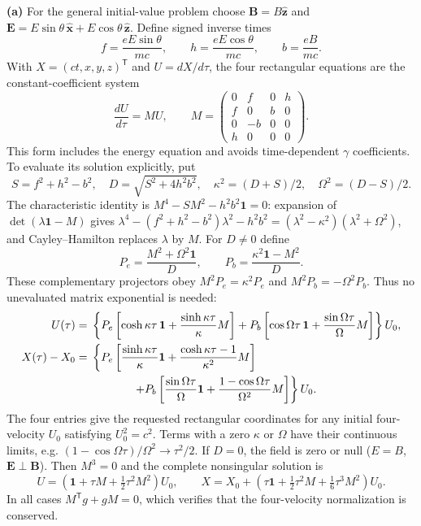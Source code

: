 \medskip\noindent\textbf{(a)} For the general initial-value problem choose
$\mathbf B=B\widehat{\mathbf z}$ and
$\mathbf E=E\sin\theta\,\widehat{\mathbf x}
+E\cos\theta\,\widehat{\mathbf z}$.  Define signed inverse times
\[
f=\frac{eE\sin\theta}{mc},\qquad
h=\frac{eE\cos\theta}{mc},\qquad b=\frac{eB}{mc}.
\]
With $X=(ct,x,y,z)^{\mathsf T}$ and $U=dX/d\tau$, the four
rectangular equations are the constant-coefficient system
\[
\frac{dU}{d\tau}=MU,\qquad
M=\begin{pmatrix}0&f&0&h\\ f&0&b&0\\0&-b&0&0\\h&0&0&0\end{pmatrix}.
\]
This form includes the energy equation and avoids time-dependent
$\gamma$ coefficients.  To evaluate its solution explicitly, put
\[
S=f^2+h^2-b^2,\quad D=\sqrt{S^2+4h^2b^2},\quad
\kappa^2=(D+S)/2,\quad \Omega^2=(D-S)/2.
\]
The characteristic identity is
$M^4-SM^2-h^2b^2\mathbf1=0$: expansion of
$\det(\lambda\mathbf1-M)$ gives
$\lambda^4-(f^2+h^2-b^2)\lambda^2-h^2b^2
=(\lambda^2-\kappa^2)(\lambda^2+\Omega^2)$, and
Cayley--Hamilton replaces $\lambda$ by $M$.
For $D\ne0$ define
\[
P_e=\frac{M^2+\Omega^2\mathbf1}{D},\qquad
P_b=\frac{\kappa^2\mathbf1-M^2}{D}.
\]
These complementary projectors obey $M^2P_e=\kappa^2P_e$ and
$M^2P_b=-\Omega^2P_b$.  Thus no unevaluated matrix exponential
is needed:
\begin{align*}
U(\tau)={}&\left\{P_e\left[\cosh\kappa\tau\,\mathbf1+
 \frac{\sinh\kappa\tau}{\kappa}M\right]
 +P_b\left[\cos\Omega\tau\,\mathbf1+
 \frac{\sin\Omega\tau}{\Omega}M\right]\right\}U_0,\\
X(\tau)-X_0={}&\left\{P_e\left[\frac{\sinh\kappa\tau}{\kappa}\mathbf1+
 \frac{\cosh\kappa\tau-1}{\kappa^2}M\right]\right.\\
&\left.\hspace{13mm}+P_b\left[\frac{\sin\Omega\tau}{\Omega}\mathbf1+
 \frac{1-\cos\Omega\tau}{\Omega^2}M\right]\right\}U_0.
\end{align*}
The four entries give the requested rectangular coordinates for
any initial four-velocity $U_0$ satisfying $U_0^2=c^2$.
Terms with a zero $\kappa$ or $\Omega$ have their continuous limits,
e.g. $(1-\cos\Omega\tau)/\Omega^2\to\tau^2/2$.
If $D=0$, the field is zero or null ($E=B$, $\mathbf E\perp\mathbf B$).
Then $M^3=0$ and the complete nonsingular solution is
\[
U=(\mathbf1+\tau M+\tfrac12\tau^2M^2)U_0,\qquad
X=X_0+(\tau\mathbf1+\tfrac12\tau^2M+\tfrac16\tau^3M^2)U_0.
\]
In all cases $M^{\mathsf T}g+gM=0$, which verifies that the
four-velocity normalization is conserved.

